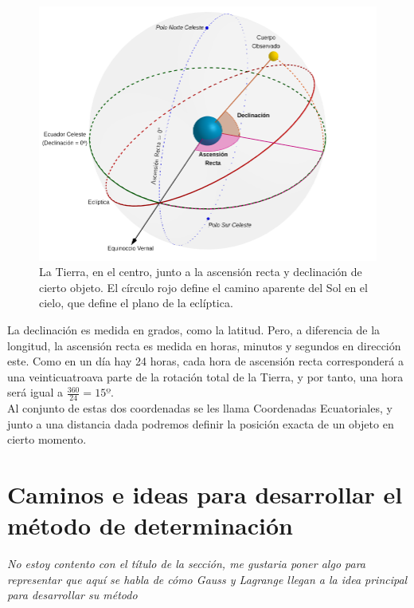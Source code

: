 \documentclass[11pt]{article}
\begin{document}
\begin{figure}[H]
\centering
\includegraphics[scale=0.4]{images/ascension_declinacion.png}
\caption{La Tierra, en el centro, junto a la ascensión recta y declinación de cierto objeto. El círculo rojo define el camino aparente del Sol en el cielo, que define el plano de la eclíptica.}
\label{fig:ascension_declinacion}
\end{figure}

La declinación es medida en grados, como la latitud. Pero, a diferencia de la longitud, la ascensión recta es medida en horas, minutos y segundos en dirección este. Como en un día hay 24 horas, cada hora de ascensión recta corresponderá a una veinticuatroava parte de la rotación total de la Tierra, y por tanto, una hora será igual a $\frac{360}{24}=15º$.\\

Al conjunto de estas dos coordenadas se les llama Coordenadas Ecuatoriales, y junto a una distancia dada podremos definir la posición exacta de un objeto en cierto momento.\\


\section{Caminos e ideas para desarrollar el método de determinación}

\textit{No estoy contento con el título de la sección, me gustaria poner algo para representar que aquí se habla de cómo Gauss y Lagrange llegan a la idea principal para desarrollar su método}\\
\end{document}
